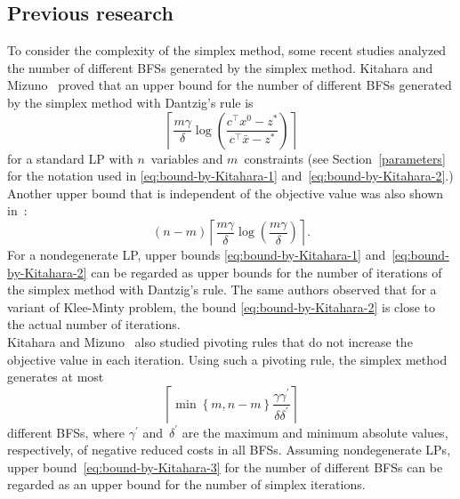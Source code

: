 \documentclass[12pt]{article}
\newcommand{\eset}[1]{\left\lbrace #1 \right\rbrace}
\begin{document}
\subsection{Previous research}
To consider the complexity of the simplex method, some recent studies analyzed the number of different BFSs generated by the simplex method.
Kitahara and Mizuno~\cite{km2013} proved that an upper bound for the number of different BFSs generated by the simplex method with Dantzig's rule is
\begin{equation} \label{eq:bound-by-Kitahara-1}
  \left\lceil \frac{m\gamma}{\delta} \log\left( \frac{c^{\top} x^0 - z^*}{c^{\top} \bar{x} - z^*} \right) \right\rceil
\end{equation}
for a standard LP with $n$~variables and $m$~constraints (see Section~\ref{parameters} for the notation used in \eqref{eq:bound-by-Kitahara-1} and~\eqref{eq:bound-by-Kitahara-2}.)
Another upper bound that is independent of the objective value was also shown in~\cite{km2013}:
\begin{equation} \label{eq:bound-by-Kitahara-2}
  (n-m) \left\lceil \frac{m\gamma}{\delta} \log\left( \frac{m\gamma}{\delta} \right) \right\rceil.
\end{equation}
For a nondegenerate LP, upper bounds \eqref{eq:bound-by-Kitahara-1} and~\eqref{eq:bound-by-Kitahara-2} can be regarded as upper bounds for the number of iterations of the simplex method with Dantzig's rule.
The same authors \cite{km2011} observed that for a variant of Klee-Minty problem, the bound \eqref{eq:bound-by-Kitahara-2} is close to the actual number of iterations.\\

Kitahara and Mizuno~\cite{km2013a} also studied pivoting rules that do not increase the objective value in each iteration.
Using such a pivoting rule, the simplex method generates at most
\begin{equation} \label{eq:bound-by-Kitahara-3}
  \left\lceil \min\eset{m,n-m} \frac{\gamma \gamma^{\prime}}{\delta \delta^{\prime}} \right\rceil
\end{equation}
different BFSs, where $\gamma^{\prime}$ and~$\delta^{\prime}$ are the maximum and minimum absolute values, respectively, of negative reduced costs in all BFSs.
Assuming nondegenerate LPs, upper bound~\eqref{eq:bound-by-Kitahara-3} for the number of different BFSs can be regarded as an upper bound for the number of simplex iterations.\\
\end{document}
